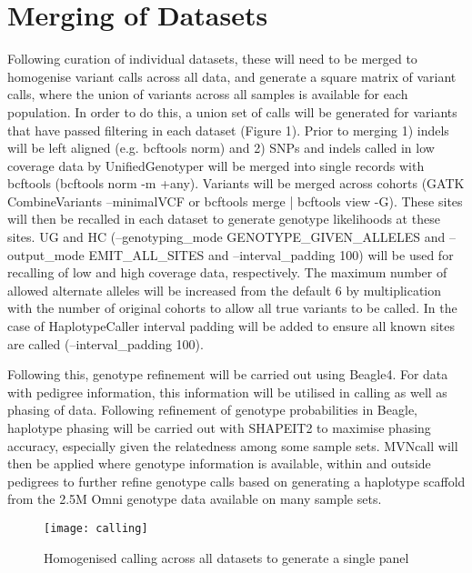 \section{Merging of Datasets}

Following curation of individual datasets, these will need to be merged to homogenise variant calls across all data, and generate a square matrix of variant calls, where the union of variants across all samples is available for each population. In order to do this, a union set of calls will be generated for variants that have passed filtering in each dataset (Figure 1). Prior to merging 1) indels will be left aligned (e.g. bcftools norm) and 2) SNPs and indels called in low coverage data by UnifiedGenotyper will be merged into single records with bcftools (bcftools norm -m +any).
Variants will be merged across cohorts (GATK CombineVariants --minimalVCF or bcftools merge | bcftools view -G). These sites will then be recalled in each dataset to generate genotype likelihoods at these sites.
UG and HC (--genotyping\_mode GENOTYPE\_GIVEN\_ALLELES and --output\_mode EMIT\_ALL\_SITES and --interval_padding 100) will be used for recalling of low and high coverage data, respectively.
The maximum number of allowed alternate alleles will be increased from the default 6 by multiplication with the number of original cohorts to allow all true variants to be called. In the case of HaplotypeCaller interval padding will be added to ensure all known sites are called (--interval_padding 100).

Following this, genotype refinement will be carried out using Beagle4. For data with pedigree information, this information will be utilised in calling as well as phasing of data. Following refinement of genotype probabilities in Beagle, haplotype phasing will be carried out with SHAPEIT2 to maximise phasing accuracy, especially given the relatedness among some sample sets. MVNcall\cite{Menelaou2013} will then be applied where genotype information is available, within and outside pedigrees to further refine genotype calls based on generating a haplotype scaffold from the 2.5M Omni genotype data available on many sample sets.

\begin{figure}[h]
\caption{Homogenised calling across all datasets to generate a single panel}
\centering
\texttt{[image: calling]}
\end{figure}

